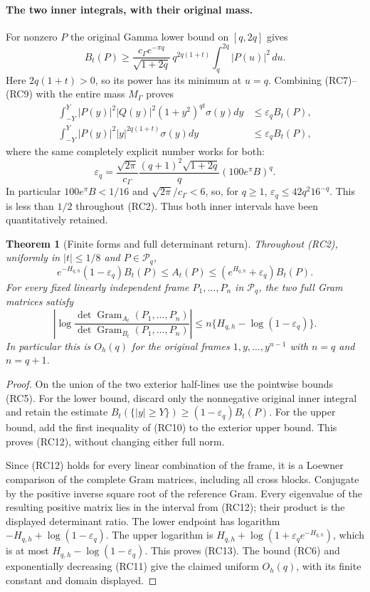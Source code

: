 \documentclass[11pt]{article}
\newtheorem{theorem}{Theorem}
\begin{document}
\paragraph{The two inner integrals, with their original mass.}
For nonzero $P$ the original Gamma lower bound on $[q,2q]$ gives
\[
 B_t(P)\geq
 \frac{c_\Gamma e^{-\pi q}}{\sqrt{1+2q}}\,
 q^{2q(1+t)}\int_q^{2q}|P(u)|^2\,du.              \tag{RC9}
\]
Here $2q(1+t)>0$, so its power has its minimum at $u=q$.
Combining (RC7)--(RC9) with the entire mass $M_\Gamma$ proves
\[
 \begin{split}
 \int_{-Y}^Y|P(y)|^2|Q(y)|^2(1+y^2)^{qt}\sigma(y)dy
       &\leq\varepsilon_q B_t(P),\\
 \int_{-Y}^Y|P(y)|^2|y|^{2q(1+t)}\sigma(y)dy
       &\leq\varepsilon_q B_t(P),
 \end{split}                                    \tag{RC10}
\]
where the same completely explicit number works for both:
\[
 \varepsilon_q=
 \frac{\sqrt{2\pi}}{c_\Gamma}
 \frac{(q+1)^2\sqrt{1+2q}}{q}
          \left(100e^\pi B\right)^q.             \tag{RC11}
\]
In particular $100e^\pi B<1/16$ and
$\sqrt{2\pi}/c_\Gamma<6$, so, for $q\geq1$,
$\varepsilon_q\leq42q^2 16^{-q}$.
This is less than $1/2$ throughout (RC2).
Thus both inner intervals have been quantitatively retained.

\begin{theorem}[Finite forms and full determinant return]
Throughout (RC2), uniformly in $|t|\leq1/8$ and
$P\in\mathcal P_q$,
\[
 e^{-H_{q,h}}(1-\varepsilon_q)B_t(P)
 \leq A_t(P)\leq(e^{H_{q,h}}+\varepsilon_q)B_t(P).
 \tag{RC12}
\]
For every fixed linearly independent frame $P_1,\ldots,P_n$
in $\mathcal P_q$, the two full Gram matrices satisfy
\[
 \left|\log
 \frac{\det\operatorname{Gram}_{A_t}(P_1,\ldots,P_n)}
      {\det\operatorname{Gram}_{B_t}(P_1,\ldots,P_n)}
 \right|
 \leq n\{H_{q,h}-\log(1-\varepsilon_q)\}.
 \tag{RC13}
\]
In particular this is $O_h(q)$ for the original frames
$1,y,\ldots,y^{n-1}$ with $n=q$ and $n=q+1$.
\end{theorem}
\begin{proof}
On the union of the two exterior half-lines use the pointwise bounds
(RC5). For the lower bound, discard only the nonnegative original inner
integral and retain the estimate
$B_t(\{|y|\geq Y\})\geq(1-\varepsilon_q)B_t(P)$.
For the upper bound, add the first inequality of (RC10) to the exterior
upper bound. This proves (RC12), without changing either full norm.

Since (RC12) holds for every linear combination of the frame, it is a
Loewner comparison of the complete Gram matrices, including all cross
blocks. Conjugate by the positive inverse square root of the reference
Gram. Every eigenvalue of the resulting positive matrix lies in the
interval from (RC12); their product is the displayed determinant ratio.
The lower endpoint has logarithm
$-H_{q,h}+\log(1-\varepsilon_q)$.
The upper logarithm is
$H_{q,h}+\log(1+\varepsilon_q e^{-H_{q,h}})$, which is at most
$H_{q,h}-\log(1-\varepsilon_q)$.
This proves (RC13).
The bound (RC6) and exponentially decreasing (RC11) give the claimed
uniform $O_h(q)$, with its finite constant and domain displayed.
\end{proof}
\end{document}
